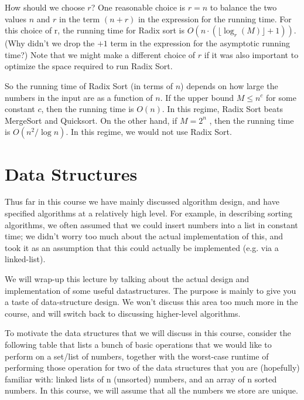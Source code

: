 \documentclass [12pt]{article}
\begin{document}
How should we choose $r$? One reasonable choice is $r = n$ to balance the two values $n$ and $r$ in the term $(n +r)$ in the expression for the running time. For this choice of r, the running time for Radix sort is $O(n \cdot (\lfloor\log_r (M)\rfloor + 1))$. (Why didn’t we drop the $+1$ term in the expression
for the asymptotic running time?) Note that we might make a different choice of $r$ if it was also important to optimize the space required to run Radix Sort.

So the running time of Radix Sort (in terms of $n$) depends on how large the numbers in the input are as a function of $n$. If the upper bound $M \leq n^c$ for some constant $c$, then the running time is $O(n)$. In this regime, Radix Sort beats MergeSort and Quicksort. On the other hand, if $M = 2^n$ , then the running time is $O(n^2/\log n)$. In this regime, we would not use Radix Sort.


\section{Data Structures}

Thus far in this course we have mainly discussed algorithm design, and have specified algorithms at a relatively high level. For example, in describing sorting algorithms, we often assumed that we could insert numbers into a list in constant time; we didn’t worry too much about the actual implementation of this, and took it as an assumption that this could actually be implemented (e.g. via a linked-list).


We will wrap-up this lecture by talking about the actual design and implementation of some useful datastructures. The purpose is mainly to give you a taste of data-structure design. We won’t discuss this area too much more in the course, and will switch back to discussing higher-level algorithms. 

To motivate the data structures that we will discuss in this course, consider the following table that lists a bunch of basic operations that we would like to perform on a set/list of numbers, together with the worst-case runtime of performing those operation for two of the data structures that you are (hopefully) familiar with: linked lists of n (unsorted) numbers, and an array of n sorted numbers. In this course, we will assume that all the numbers we store are unique.
\end{document}

